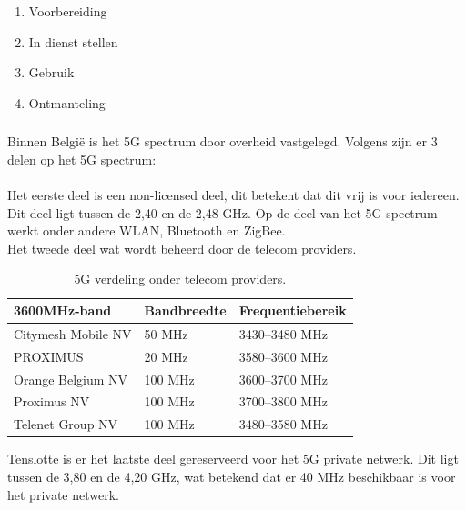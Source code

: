 \begin{enumerate}
  \item Voorbereiding
  \item In dienst stellen
  \item Gebruik
  \item Ontmanteling
\end{enumerate}


\subsubsection{}
\label{public-v-private}

Binnen België is het 5G spectrum door overheid vastgelegd. Volgens \textcite{Eede2023} zijn er 3 delen op het 5G spectrum:\\\\
Het eerste deel is een non-licensed deel, dit betekent dat dit vrij is voor iedereen. Dit deel ligt tussen de 2,40 en de 2,48 GHz. Op de deel van het 5G spectrum werkt onder andere WLAN, Bluetooth en ZigBee.\\
Het tweede deel wat wordt beheerd door de telecom providers.

\begin{table}[H]
\centering
\begin{tabular}{|l|l|l|}
\hline
\textbf{3600MHz-band}      & \textbf{Bandbreedte} & \textbf{Frequentiebereik}    \\ \hline
Citymesh Mobile NV         & 50 MHz               & 3430--3480 MHz               \\ \hline
PROXIMUS                   & 20 MHz               & 3580--3600 MHz               \\ \hline
Orange Belgium NV          & 100 MHz              & 3600--3700 MHz               \\ \hline
Proximus NV                & 100 MHz              & 3700--3800 MHz               \\ \hline
Telenet Group NV           & 100 MHz              & 3480--3580 MHz               \\ \hline
\end{tabular}
\caption{5G verdeling onder telecom providers. \autocite[Door][Copyright 2023 van]{Eede2023} \textcite{Eede2023}}
\end{table}


Tenslotte is er het laatste deel gereserveerd voor het 5G private netwerk.  Dit ligt tussen de 3,80 en de 4,20 GHz, wat betekend dat er 40 MHz beschikbaar is voor het private netwerk.


